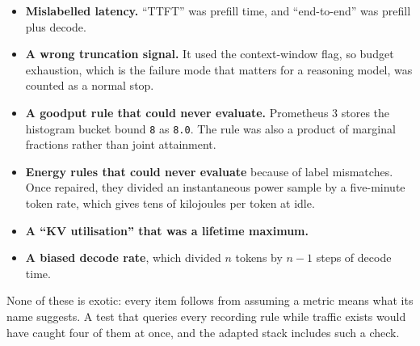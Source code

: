 \documentclass[11pt]{article}
\begin{document}
\begin{itemize}
\item \textbf{Mislabelled latency.} ``TTFT'' was prefill time, and ``end-to-end'' was prefill plus
decode.
\item \textbf{A wrong truncation signal.} It used the context-window flag, so budget exhaustion,
which is the failure mode that matters for a reasoning model, was counted as a normal stop.
\item \textbf{A goodput rule that could never evaluate.} Prometheus 3 stores the histogram bucket
bound \texttt{8} as \texttt{8.0}. The rule was also a product of marginal fractions rather than joint
attainment.
\item \textbf{Energy rules that could never evaluate} because of label mismatches. Once repaired, they
divided an instantaneous power sample by a five-minute token rate, which gives tens of kilojoules per
token at idle.
\item \textbf{A ``KV utilisation'' that was a lifetime maximum.}
\item \textbf{A biased decode rate}, which divided $n$ tokens by $n-1$ steps of decode time.
\end{itemize}

None of these is exotic: every item follows from assuming a metric means what its name suggests. A
test that queries every recording rule while traffic exists would have caught four of them at once,
and the adapted stack includes such a check.
\end{document}
